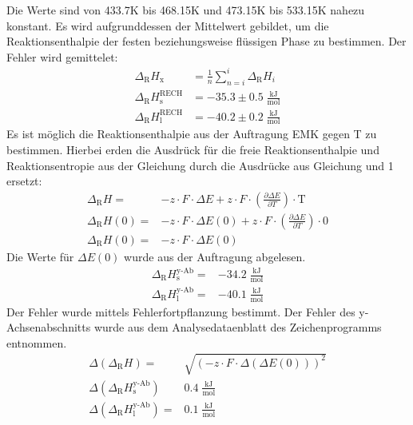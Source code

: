\documentclass[12pt,a4paper,titlepage,headinclude,bibtotoc]{scrartcl}
\begin{document}
\FloatBarrier
Die Werte sind von 433.7\;K bis 468.15\;K und 473.15\;K bis 533.15\;K nahezu konstant. Es wird aufgrunddessen der Mittelwert gebildet, um die Reaktionsenthalpie der festen beziehungsweise flüssigen Phase zu bestimmen. Der Fehler wird gemittelet:
\begin{align}
\Delta_\text{R} H_{\text{x}}&= \frac{1}{n}  \sum_{n=i}^i \Delta_\text{R} H_i  \\
\Delta_\text{R} H_{\text{s}}^{\text{RECH}}&= -35.3 \pm 0.5\;\frac{\text{kJ}}{\text{mol}}\\
\Delta_\text{R} H_{\text{l}}^{\text{RECH}}&= -40.2 \pm 0.2\;\frac{\text{kJ}}{\text{mol}}
\end{align}
Es ist möglich die Reaktionsenthalpie aus der Auftragung EMK gegen T zu bestimmen. Hierbei erden die Ausdrück für die freie Reaktionsenthalpie und Reaktionsentropie aus der Gleichung durch die Ausdrücke aus Gleichung und 1 ersetzt:
\begin{align}
\Delta_\text{R} H=&  - z\cdot F \cdot\Delta E +  z \cdot F \cdot \left(\frac{\partial \Delta E}{\partial T}\right)\cdot\text{T} \\ 
\Delta_\text{R} H(0)=&  - z\cdot F\cdot \Delta E(0) +  z \cdot F \cdot \left(\frac{\partial \Delta E}{\partial T}\right)\cdot 0\\ 
\Delta_\text{R} H(0)=&  - z\cdot F \cdot\Delta E(0)
\end{align}
Die Werte für $\Delta E(0)$ wurde aus der Auftragung abgelesen. 
\begin{align}
\Delta_\text{R} H_{\text{s}}^{\text{y-Ab}}=& -34.2\;\frac{\text{kJ}}{\text{mol}}\\
\Delta_\text{R} H_{\text{l}}^{\text{y-Ab}}=&  -40.1\;\frac{\text{kJ}}{\text{mol}}
\end{align}
Der Fehler wurde mittels Fehlerfortpflanzung bestimmt. Der Fehler des y-Achsenabschnitts wurde aus dem Analysedataenblatt des Zeichenprogramms entnommen.
\begin{align}
\Delta(\Delta_\text{R} H)=& \sqrt{(- z\cdot F \cdot\Delta(\Delta E(0)))^2}\\
\Delta(\Delta_\text{R} H_{\text{s}}^{\text{y-Ab}})&  0.4\;\frac{\text{kJ}}{\text{mol}}\\
\Delta(\Delta_\text{R} H_{\text{l}}^{\text{y-Ab}})=&  0.1\;\frac{\text{kJ}}{\text{mol}}
\end{align}
\end{document}
